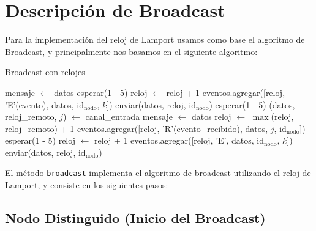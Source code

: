 \section{Descripción de Broadcast}

Para la implementación del reloj de Lamport usamos como base el algoritmo de Broadcast, y principalmente nos basamos en el siguiente algoritmo:

\begin{algorithm}
	\caption{Broadcast con relojes}
	\begin{algorithmic}[1]
		\State mensaje $\gets$ datos
		\State esperar(1 - 5)
		\State reloj $\gets$ reloj + 1
		\State eventos.agregar([reloj, 'E'(evento), datos, $\text{id}_{\text{nodo}}$, $k$])
		\State enviar(datos, reloj, $\text{id}_{\text{nodo}}$)
		\EndFor
		\EndIf
		\State esperar(1 - 5)
		\State (datos, reloj\_remoto, $j$) $\gets$ canal\_entrada
		\State mensaje $\gets$ datos
		\State reloj $\gets$ $\max$(reloj, reloj\_remoto) + 1
		\State eventos.agregar([reloj, 'R'(evento\_recibido), datos, $j$, $\text{id}_{\text{nodo}}$])
		\State esperar(1 - 5)
		\State reloj $\gets$ reloj + 1
		\State eventos.agregar([reloj, 'E', datos, $\text{id}_{\text{nodo}}$, $k$])
		\State enviar(datos, reloj, $\text{id}_{\text{nodo}}$)
		\EndIf
		\EndFor
		\EndWhile
	\end{algorithmic}
\end{algorithm}



El método \texttt{broadcast} implementa el algoritmo de broadcast utilizando el reloj de Lamport, y consiste en los siguientes pasos:

\subsection{Nodo Distinguido (Inicio del Broadcast)}

